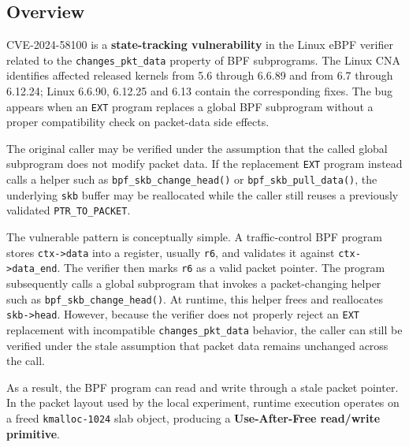 \documentclass[../main.tex]{subfiles}
\begin{document}
\subsection{Overview}

CVE-2024-58100 is a \textbf{state-tracking vulnerability} in the Linux eBPF verifier related to the \texttt{changes\_pkt\_data} property of BPF subprograms. The Linux CNA identifies affected released kernels from 5.6 through 6.6.89 and from 6.7 through 6.12.24; Linux 6.6.90, 6.12.25 and 6.13 contain the corresponding fixes. The bug appears when an \texttt{EXT} program replaces a global BPF subprogram without a proper compatibility check on packet-data side effects.

The original caller may be verified under the assumption that the called global subprogram does not modify packet data. If the replacement \texttt{EXT} program instead calls a helper such as \texttt{bpf\_skb\_change\_head()} or \texttt{bpf\_skb\_pull\_data()}, the underlying \texttt{skb} buffer may be reallocated while the caller still reuses a previously validated \texttt{PTR\_TO\_PACKET}.

The vulnerable pattern is conceptually simple. A traffic-control BPF program stores \texttt{ctx->data} into a register, usually \texttt{r6}, and validates it against \texttt{ctx->data\_end}. The verifier then marks \texttt{r6} as a valid packet pointer. The program subsequently calls a global subprogram that invokes a packet-changing helper such as \texttt{bpf\_skb\_change\_head()}. At runtime, this helper frees and reallocates \texttt{skb->head}. However, because the verifier does not properly reject an \texttt{EXT} replacement with incompatible \texttt{changes\_pkt\_data} behavior, the caller can still be verified under the stale assumption that packet data remains unchanged across the call.

As a result, the BPF program can read and write through a stale packet pointer. In the packet layout used by the local experiment, runtime execution operates on a freed \texttt{kmalloc-1024} slab object, producing a \textbf{Use-After-Free read/write primitive}.
\end{document}
